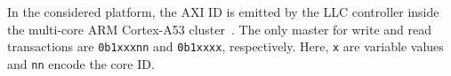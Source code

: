 In the considered platform, the AXI ID is emitted by the LLC
controller inside the multi-core ARM Cortex-A53
cluster~\cite{ARM-cortex-A53}. The only master for write and read
transactions are \verb|0b1xxxnn| and \verb|0b1xxxx|,
respectively. Here, \verb|x| are variable values and \verb|nn| encode
the core ID. 



